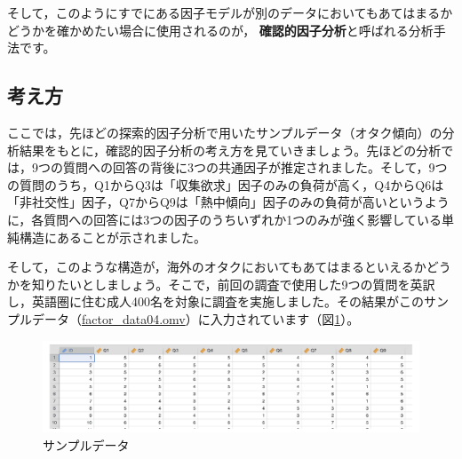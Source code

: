 \documentclass[
  12pt,
  a5jpaper,
  lualatex, ja=standard]{bxjsbook}
\renewcommand{\emph}[1]{\textbf{\color{emph} #1}}
\begin{document}
そして，このようにすでにある因子モデルが別のデータにおいてもあてはまるかどうかを確かめたい場合に使用されるのが，\emph{確認的因子分析}と呼ばれる分析手法です。

\hypertarget{sub:factor-cfa-basics}{%
\subsection{考え方}\label{sub:factor-cfa-basics}}

ここでは，先ほどの探索的因子分析で用いたサンプルデータ（オタク傾向）の分析結果をもとに，確認的因子分析の考え方を見ていきましょう。先ほどの分析では，9つの質問への回答の背後に3つの共通因子が推定されました。そして，9つの質問のうち，Q1からQ3は「収集欲求」因子のみの負荷が高く，Q4からQ6は「非社交性」因子，Q7からQ9は「熱中傾向」因子のみの負荷が高いというように，各質問への回答には3つの因子のうちいずれか1つのみが強く影響している単純構造にあることが示されました。

そして，このような構造が，海外のオタクにおいてもあてはまるといえるかどうかを知りたいとしましょう。そこで，前回の調査で使用した9つの質問を英訳し，英語圏に住む成人400名を対象に調査を実施しました。その結果がこのサンプルデータ（\href{https://github.com/sbtseiji/jmv_compguide/raw/main/data/omv/factor_data04.omv}{factor\_data04.omv}）に入力されています（図\ref{fig:factor-data04}）。

\begin{figure}[!ht]

{\centering \includegraphics[width=1\linewidth]{images/factor/data04} 

}

\caption{サンプルデータ}\label{fig:factor-data04}
\end{figure}
\end{document}
